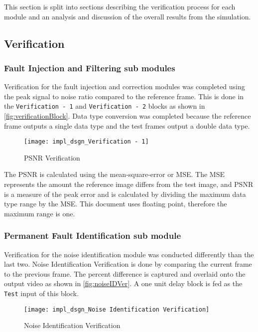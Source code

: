 This section is split into sections describing the verification process for each module and an analysis and discussion of the overall results from the simulation.
\subsection{Verification}
\subsubsection{Fault Injection and Filtering sub modules}\label{sec:verifFaultInjectFilter}
\par Verification for the fault injection and correction modules was completed using the peak signal to noise ratio compared to the reference frame. This is done in the \verb!Verification - 1! and \verb!Verification - 2! blocks as shown in \autoref{fig:verificationBlock}. Data type conversion was completed because the reference frame outputs a single data type and the test frames output a double data type.
\begin{figure}[H]
    \texttt{[image: impl\_dsgn\_Verification - 1]}
    \caption{PSNR Verification}
    \label{fig:verificationBlock}
\end{figure}
\par The PSNR is calculated using the mean-square-error or MSE. The MSE represents the amount the reference image differs from the test image, and PSNR is a measure of the peak error and is calculated by dividing the maximum data type range by the MSE. This document uses floating point, therefore the maximum range is one\cite{mathworks}.
\subsubsection{Permanent Fault Identification sub module}\label{sec:permFaultID}
\par Verification for the noise identification module was conducted differently than the last two. Noise Identification Verification is done by comparing the current frame to the previous frame. The percent difference is captured and overlaid onto the output video as shown in \autoref{fig:noiseIDVer}. A one unit delay block is fed as the \verb!Test! input of this block.
\begin{figure}[H]
    \texttt{[image: impl\_dsgn\_Noise Identification Verification]}
    \caption{Noise Identification Verification}
    \label{fig:noiseIDVer}
\end{figure}

